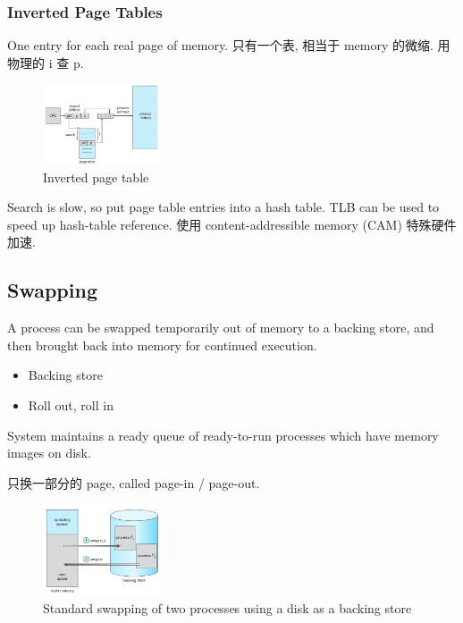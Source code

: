 \subsubsection{Inverted Page Tables}
One entry for each real page of memory. 只有一个表, 相当于 memory 的微缩. 用物理的 i 查 p. 

\begin{figure}[!htb]
    \centering
    \includegraphics[width=0.309\textwidth]{pic/OS8/Inverted page table}
    \caption{Inverted page table}
\end{figure}
Search is slow, so put page table entries into a hash table. TLB can be used to speed up hash-table reference. 使用 content-addressible memory (CAM) 特殊硬件加速. 


\subsection{Swapping}
A process can be swapped temporarily out of memory to a backing store,
and then brought back into memory for continued execution. 

\begin{itemize}
    \item Backing store
    \item Roll out, roll in
\end{itemize}
System maintains a ready queue of ready-to-run processes which have
memory images on disk. 

只换一部分的 page, called page-in / page-out. 

\begin{figure}[!htb]
    \centering
    \includegraphics[width=0.309\textwidth]{pic/OS8/Standard swapping of two processes using a disk as a backing store}
    \caption{Standard swapping of two processes using a disk as a backing store}
\end{figure}

